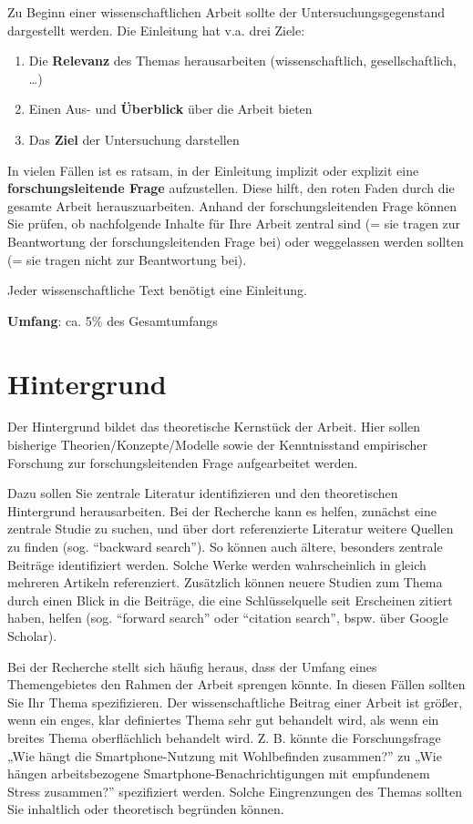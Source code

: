 \documentclass[
  letterpaper,
  DIV=11]{scrreprt}
\begin{document}
Zu Beginn einer wissenschaftlichen Arbeit sollte der
Untersuchungsgegenstand dargestellt werden. Die Einleitung hat v.a. drei
Ziele:

\begin{enumerate}
\def\labelenumi{\arabic{enumi}.}
\item
  Die \textbf{Relevanz} des Themas herausarbeiten (wissenschaftlich,
  gesellschaftlich, \ldots)
\item
  Einen Aus- und \textbf{Überblick} über die Arbeit bieten
\item
  Das \textbf{Ziel} der Untersuchung darstellen
\end{enumerate}

In vielen Fällen ist es ratsam, in der Einleitung implizit oder explizit
eine \textbf{forschungsleitende Frage} aufzustellen. Diese hilft, den
roten Faden durch die gesamte Arbeit herauszuarbeiten. Anhand der
forschungsleitenden Frage können Sie prüfen, ob nachfolgende Inhalte für
Ihre Arbeit zentral sind (= sie tragen zur Beantwortung der
forschungsleitenden Frage bei) oder weggelassen werden sollten (= sie
tragen nicht zur Beantwortung bei).

Jeder wissenschaftliche Text benötigt eine Einleitung.

\textbf{Umfang}: ca. 5\% des Gesamtumfangs

\section{Hintergrund}\label{hintergrund}

Der Hintergrund bildet das theoretische Kernstück der Arbeit. Hier
sollen bisherige Theorien/Konzepte/Modelle sowie der Kenntnisstand
empirischer Forschung zur forschungsleitenden Frage aufgearbeitet
werden.

Dazu sollen Sie zentrale Literatur identifizieren und den theoretischen
Hintergrund herausarbeiten. Bei der Recherche kann es helfen, zunächst
eine zentrale Studie zu suchen, und über dort referenzierte Literatur
weitere Quellen zu finden (sog. ``backward search''). So können auch
ältere, besonders zentrale Beiträge identifiziert werden. Solche Werke
werden wahrscheinlich in gleich mehreren Artikeln referenziert.
Zusätzlich können neuere Studien zum Thema durch einen Blick in die
Beiträge, die eine Schlüsselquelle seit Erscheinen zitiert haben, helfen
(sog. ``forward search'' oder ``citation search'', bspw. über Google
Scholar).

Bei der Recherche stellt sich häufig heraus, dass der Umfang eines
Themengebietes den Rahmen der Arbeit sprengen könnte. In diesen Fällen
sollten Sie Ihr Thema spezifizieren. Der wissenschaftliche Beitrag einer
Arbeit ist größer, wenn ein enges, klar definiertes Thema sehr gut
behandelt wird, als wenn ein breites Thema oberflächlich behandelt wird.
Z. B. könnte die Forschungsfrage „Wie hängt die Smartphone-Nutzung mit
Wohlbefinden zusammen?'' zu „Wie hängen arbeitsbezogene
Smartphone-Benachrichtigungen mit empfundenem Stress zusammen?''
spezifiziert werden. Solche Eingrenzungen des Themas sollten Sie
inhaltlich oder theoretisch begründen können.
\end{document}
